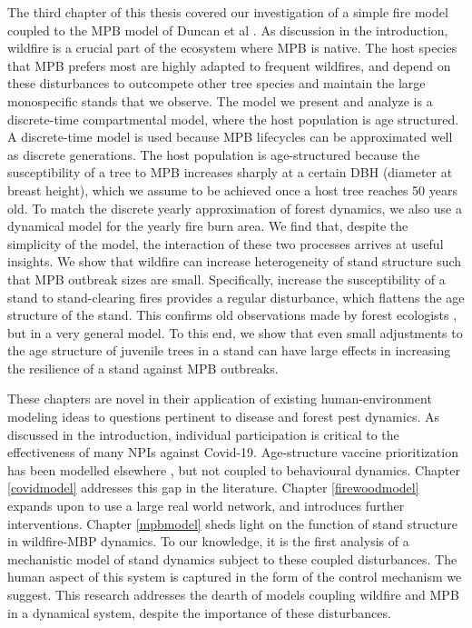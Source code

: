 The third chapter of this thesis covered our investigation of a simple fire model coupled to the MPB model of Duncan et al \cite{duncan2015model}. As discussion in the introduction, wildfire is a crucial part of the ecosystem where MPB is native. The host species that MPB prefers most are highly adapted to frequent wildfires, and depend on these disturbances to outcompete other tree species and maintain the large monospecific stands that we observe. The model we present and analyze is a discrete-time compartmental model, where the host population is age structured. A discrete-time model is used because MPB lifecycles can be approximated well as discrete generations. The host population is age-structured because the susceptibility of a tree to MPB increases sharply at a certain DBH (diameter at breast height), which we assume to be achieved once a host tree reaches 50 years old. To match the discrete yearly approximation of forest dynamics, we also use a dynamical model for the yearly fire burn area. We find that, despite the simplicity of the model, the interaction of these two processes arrives at useful insights. We show that wildfire can increase heterogeneity of stand structure such that MPB outbreak sizes are small. Specifically, increase the susceptibility of a stand to stand-clearing fires provides a regular disturbance, which flattens the age structure of the stand. This confirms old observations made by forest ecologists \cite{kaufmann2008status, seidl2016spatial}, but in a very general model. To this end, we show that even small adjustments to the age structure of juvenile trees in a stand can have large effects in increasing the resilience of a stand against MPB outbreaks.     

These chapters are novel in their application of existing human-environment modeling ideas to questions pertinent to disease and forest pest dynamics. As discussed in the introduction, individual participation is critical to the effectiveness of many NPIs against Covid-19. Age-structure vaccine prioritization has been modelled elsewhere \cite{bubar2020model,hoyt2020vaccine}, but not coupled to behavioural dynamics. Chapter \ref{covidmodel} addresses this gap in the literature. Chapter \ref{firewoodmodel} expands upon \cite{barlow2014modelling} to use a large real world network, and introduces further interventions. Chapter \ref{mpbmodel} sheds light on the function of stand structure in wildfire-MBP dynamics. To our knowledge, it is the first analysis of a mechanistic model  of stand dynamics subject to these coupled disturbances. The human aspect of this system is captured in the form of the control mechanism we suggest. This research addresses the dearth of models coupling wildfire and MPB in a dynamical system, despite the importance of these disturbances.  



